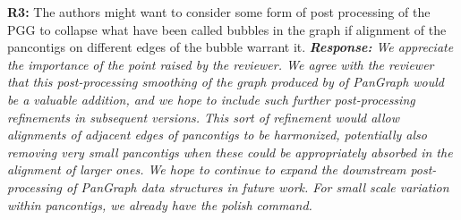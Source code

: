 \documentclass[aps,rmp,onecolumn]{revtex4-1}
\newcommand{\Marco}[1]{{\color{orange}Marco: #1}}
\newcommand{\reviewer}[2]{\textbf{#1:} #2\vskip 5mm}
\newcommand{\response}[1]{{\it {\color{response}\textbf{Response:} #1}}\vskip 5mm}
\begin{document}
\reviewer{R3}{The authors might want to consider some form of post processing of the PGG to collapse what have been called bubbles in the graph if alignment of the pancontigs on different edges of the bubble warrant it.}
\response{
      We appreciate the importance of the point raised by the reviewer.
      We agree with the reviewer that this post-processing smoothing of the graph produced by of \textit{PanGraph} would be a valuable addition, and we hope to include such further post-processing refinements in subsequent versions. 
      This sort of refinement would allow alignments of adjacent edges of pancontigs to be harmonized, potentially also removing very small pancontigs when these could be appropriately absorbed in the alignment of larger ones. We hope to continue to expand the downstream post-processing of \textit{PanGraph} data structures in future work. 
      For small scale variation within pancontigs, we already have the {\it polish} command. 
}
\end{document}
